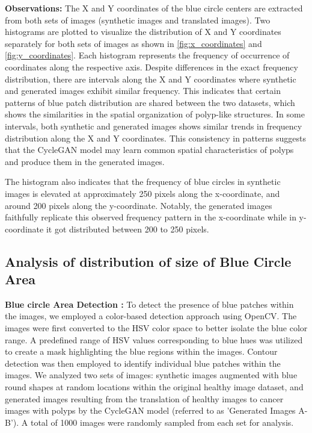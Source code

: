 \documentclass[UKenglish,12pt]{master-style}
\begin{document}
\textbf{Observations:}
The X and Y coordinates of the blue circle centers are extracted from both sets of images (synthetic images and translated images).
Two histograms are plotted to visualize the distribution of X and Y coordinates separately for both sets of images as shown in \ref{fig:x_coordinates} and \ref{fig:y_coordinates}. Each histogram represents the frequency of occurrence of coordinates along the respective axis.
Despite differences in the exact frequency distribution, there are intervals along the X and Y coordinates where synthetic and generated images exhibit similar frequency. This indicates that certain patterns of blue patch distribution are shared between the two datasets, which shows the  similarities in the spatial organization of polyp-like structures. In some intervals, both synthetic and generated images shows similar trends in frequency distribution along the X and Y coordinates. This consistency in patterns suggests that the CycleGAN model may learn common spatial characteristics of polyps and produce them in the generated images.

The histogram also indicates that the frequency of blue circles in synthetic images is elevated at approximately 250 pixels along the x-coordinate, and around 200 pixels along the y-coordinate. Notably, the generated images faithfully replicate this observed frequency pattern in the x-coordinate while in y-coordinate it got distributed between 200 to 250 pixels.

\subsection{Analysis of distribution of size of Blue Circle Area}

\textbf{Blue circle Area Detection :}
To detect the presence of blue patches within the images, we employed a color-based detection approach using OpenCV. The images were first converted to the HSV color space to better isolate the blue color range. A predefined range of HSV values corresponding to blue hues was utilized to create a mask highlighting the blue regions within the images. Contour detection was then employed to identify individual blue patches within the images. We analyzed two sets of images: synthetic images augmented with blue round shapes at random locations within the original healthy image dataset, and generated images resulting from the translation of healthy images to cancer images with polyps by the CycleGAN model (referred to as 'Generated Images A-B'). A total of 1000 images were randomly sampled from each set for analysis.
\end{document}

